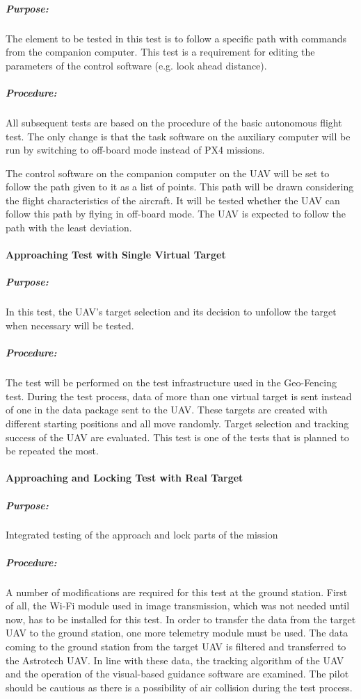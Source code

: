 \documentclass[12pt]{article}
\begin{document}
\subparagraph*{Purpose:} The element to be tested in this test is to follow a specific path with commands from the companion computer. This test is a requirement for editing the parameters of the control software (e.g. look ahead distance).

\subparagraph*{Procedure:}

All subsequent tests are based on the procedure of the basic autonomous flight test. The only change is that the task software on the auxiliary computer will be run by switching to off-board mode instead of PX4 missions.

\justify
The control software on the companion computer on the UAV will be set to follow the path given to it as a list of points. This path will be drawn considering the flight characteristics of the aircraft. It will be tested whether the UAV can follow this path by flying in off-board mode. The UAV is expected to follow the path with the least deviation.

\paragraph{Approaching Test with Single Virtual Target}

\subparagraph*{Purpose:} In this test, the UAV's target selection and its decision to unfollow the target when necessary will be tested. 

\subparagraph*{Procedure:} The test will be performed on the test infrastructure used in the Geo-Fencing test. During the test process, data of more than one virtual target is sent instead of one in the data package sent to the UAV. These targets are created with different starting positions and all move randomly. Target selection and tracking success of the UAV are evaluated. This test is one of the tests that is planned to be repeated the most.

\paragraph{Approaching and Locking Test with Real Target}
\subparagraph*{Purpose:} Integrated testing of the approach and lock parts of the mission 

\subparagraph*{Procedure:} A number of modifications are required for this test at the ground station. First of all, the Wi-Fi module used in image transmission, which was not needed until now, has to be installed for this test. In order to transfer the data from the target UAV to the ground station, one more telemetry module must be used. The data coming to the ground station from the target UAV is filtered and transferred to the Astrotech UAV. In line with these data, the tracking algorithm of the UAV and the operation of the visual-based guidance software are examined.  The pilot should be cautious as there is a possibility of air collision during the test process.
\end{document}
